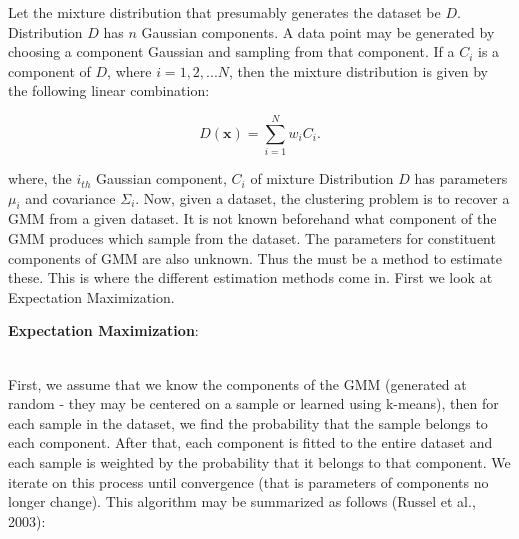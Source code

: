 \documentclass[11pt]{article}
\begin{document}
Let the mixture distribution that presumably generates the dataset be $D$. Distribution $D$ has $n$ Gaussian components. A data point may be generated by choosing a component Gaussian and sampling from that component. If a $C_i$ is a component of $D$, where $i = 1, 2,...N$, then the mixture distribution is given by the following linear combination:

\begin{equation}
\label{D}
D(\mathbf{x}) = \sum_{i = 1}^{N} w_i C_i.
\end{equation}

where, the $i_{th}$ Gaussian component, $C_i$ of mixture Distribution $D$ has parameters $\mu_i$ and covariance $\Sigma_i$. Now, given a dataset, the clustering problem is to recover a GMM from a given dataset. It is not known beforehand what component of the GMM produces which sample from the dataset. The parameters for constituent components of GMM are also unknown. Thus the must be a method to estimate these. This is where the different estimation methods come in. First we look at Expectation Maximization. \\

\begin{large}
\textbf{Expectation Maximization}:
\end{large} \\

First, we assume that we know the components of the GMM (generated at random - they may be centered on a sample or learned using k-means), then for each sample in the dataset, we find the probability that the sample belongs to each component. After that, each component is fitted to the entire dataset and each sample is weighted by the probability that it belongs to that component. We iterate on this process until convergence (that is parameters of components no longer change). This algorithm may be summarized as follows (Russel et al., 2003):
\end{document}
